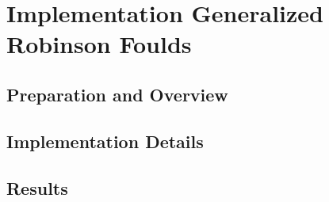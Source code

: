 \chapter{Implementation Generalized Robinson Foulds}
\section{Preparation and Overview}
\section{Implementation Details}
\section{Results}